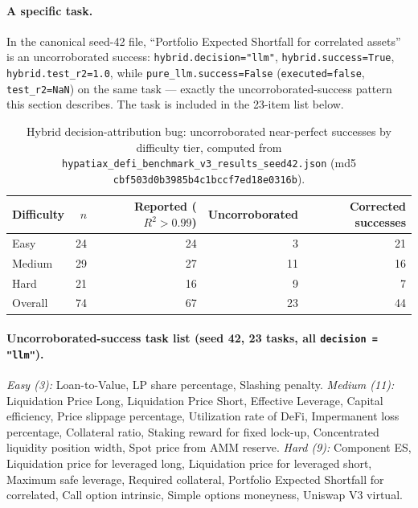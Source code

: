\documentclass[twoside,11pt]{article}
\newcommand{\Rsq}{R^{2}}
\begin{document}
\paragraph{A specific task.} In the canonical seed-42 file, ``Portfolio Expected Shortfall for correlated assets'' is an uncorroborated success: \texttt{hybrid.decision="llm"}, \texttt{hybrid.success=True}, \texttt{hybrid.test\_r2=1.0}, while \texttt{pure\_llm.success=False} (\texttt{executed=false}, \texttt{test\_r2=NaN}) on the same task --- exactly the uncorroborated-success pattern this section describes. The task is included in the 23-item list below.

\begin{table}[h]
\centering
\caption{Hybrid decision-attribution bug: uncorroborated near-perfect successes by
difficulty tier, computed from \texttt{hypatiax\_defi\_benchmark\_v3\_results\_seed42.json}
(md5 \texttt{cbf503d0b3985b4c1bccf7ed18e0316b}).}
\label{tab:hybrid-bug-breakdown}
\begin{tabular}{lrrrr}
\toprule
Difficulty & $n$ & Reported ($\Rsq>0.99$) & Uncorroborated & Corrected successes \\
\midrule
Easy    & 24 & 24 & 3  & 21 \\
Medium  & 29 & 27 & 11 & 16 \\
Hard    & 21 & 16 & 9  & 7 \\
\midrule
Overall & 74 & 67 & 23 & 44 \\
\bottomrule
\end{tabular}
\end{table}

\paragraph{Uncorroborated-success task list (seed 42, 23 tasks, all
\texttt{decision = "llm"}).} \emph{Easy (3):} Loan-to-Value, LP share
percentage, Slashing penalty.
\emph{Medium (11):} Liquidation Price Long, Liquidation Price Short,
Effective Leverage, Capital efficiency, Price slippage percentage,
Utilization rate of DeFi, Impermanent loss percentage, Collateral ratio,
Staking reward for fixed lock-up, Concentrated liquidity position width,
Spot price from AMM reserve.
\emph{Hard (9):} Component ES, Liquidation price for leveraged long,
Liquidation price for leveraged short, Maximum safe leverage, Required
collateral, Portfolio Expected Shortfall for correlated, Call option
intrinsic, Simple options moneyness, Uniswap V3 virtual.
\end{document}
